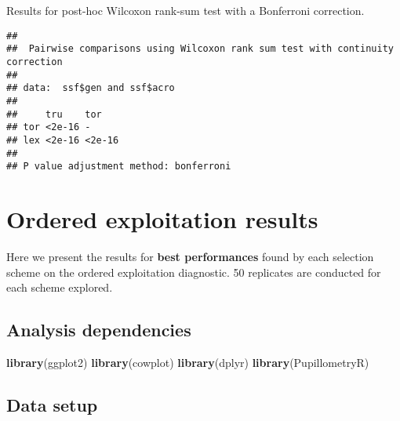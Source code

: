 \documentclass[]{book}
\newenvironment{Shaded}{\begin{snugshade}}{\end{snugshade}}
\newcommand{\DataTypeTok}[1]{\textcolor[rgb]{0.13,0.29,0.53}{#1}}
\newcommand{\KeywordTok}[1]{\textcolor[rgb]{0.13,0.29,0.53}{\textbf{#1}}}
\newcommand{\NormalTok}[1]{#1}
\newcommand{\OperatorTok}[1]{\textcolor[rgb]{0.81,0.36,0.00}{\textbf{#1}}}
\newcommand{\OtherTok}[1]{\textcolor[rgb]{0.56,0.35,0.01}{#1}}
\newcommand{\StringTok}[1]{\textcolor[rgb]{0.31,0.60,0.02}{#1}}
\begin{document}
Results for post-hoc Wilcoxon rank-sum test with a Bonferroni correction.

\begin{Shaded}
\end{Shaded}

\begin{verbatim}
## 
##  Pairwise comparisons using Wilcoxon rank sum test with continuity correction 
## 
## data:  ssf$gen and ssf$acro 
## 
##     tru    tor   
## tor <2e-16 -     
## lex <2e-16 <2e-16
## 
## P value adjustment method: bonferroni
\end{verbatim}

\hypertarget{ordered-exploitation-results}{%
\chapter{Ordered exploitation results}\label{ordered-exploitation-results}}

Here we present the results for \textbf{best performances} found by each selection scheme on the ordered exploitation diagnostic.
50 replicates are conducted for each scheme explored.

\hypertarget{analysis-dependencies-1}{%
\section{Analysis dependencies}\label{analysis-dependencies-1}}

\begin{Shaded}
\begin{Highlighting}[]
\KeywordTok{library}\NormalTok{(ggplot2)}
\KeywordTok{library}\NormalTok{(cowplot)}
\KeywordTok{library}\NormalTok{(dplyr)}
\KeywordTok{library}\NormalTok{(PupillometryR)}
\end{Highlighting}
\end{Shaded}

\hypertarget{data-setup-1}{%
\section{Data setup}\label{data-setup-1}}
\end{document}
